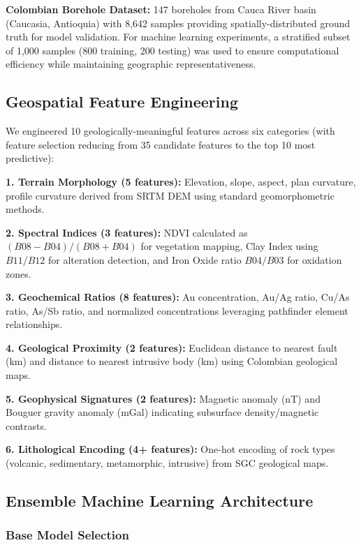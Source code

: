 \documentclass[12pt,a4paper]{article}
\begin{document}
\textbf{Colombian Borehole Dataset:} 147 boreholes from Cauca River basin (Caucasia, Antioquia) with 8,642 samples providing spatially-distributed ground truth for model validation. For machine learning experiments, a stratified subset of 1,000 samples (800 training, 200 testing) was used to ensure computational efficiency while maintaining geographic representativeness.

\subsection{Geospatial Feature Engineering}

We engineered 10 geologically-meaningful features across six categories (with feature selection reducing from 35 candidate features to the top 10 most predictive):

\textbf{1. Terrain Morphology (5 features):} Elevation, slope, aspect, plan curvature, profile curvature derived from SRTM DEM using standard geomorphometric methods.

\textbf{2. Spectral Indices (3 features):} NDVI calculated as $(B08 - B04)/(B08 + B04)$ for vegetation mapping, Clay Index using $B11/B12$ for alteration detection, and Iron Oxide ratio $B04/B03$ for oxidation zones.

\textbf{3. Geochemical Ratios (8 features):} Au concentration, Au/Ag ratio, Cu/As ratio, As/Sb ratio, and normalized concentrations leveraging pathfinder element relationships.

\textbf{4. Geological Proximity (2 features):} Euclidean distance to nearest fault (km) and distance to nearest intrusive body (km) using Colombian geological maps.

\textbf{5. Geophysical Signatures (2 features):} Magnetic anomaly (nT) and Bouguer gravity anomaly (mGal) indicating subsurface density/magnetic contrasts.

\textbf{6. Lithological Encoding (4+ features):} One-hot encoding of rock types (volcanic, sedimentary, metamorphic, intrusive) from SGC geological maps.

\subsection{Ensemble Machine Learning Architecture}

\subsubsection{Base Model Selection}
\end{document}
